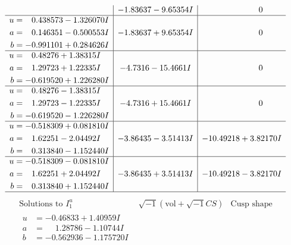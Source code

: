 \documentclass[1p]{elsarticle_modified}
\theoremstyle{definition}
\newcommand{\I}{\sqrt{-1}}
\begin{document}
$$\begin{array}{c|c|c}
 & -1.83637 - 9.65354 I & \phantom{-0.000000 } 0 \\ \hline\begin{aligned}
u &= \phantom{-}0.438573 - 1.326070 I \\
a &= \phantom{-}0.146351 - 0.500553 I \\
b &= -0.991101 + 0.284626 I\end{aligned}
 & -1.83637 + 9.65354 I & \phantom{-0.000000 } 0 \\ \hline\begin{aligned}
u &= \phantom{-}0.48276 + 1.38315 I \\
a &= \phantom{-}1.29723 + 1.22335 I \\
b &= -0.619520 + 1.226280 I\end{aligned}
 & -4.7316 - 15.4661 I & \phantom{-0.000000 } 0 \\ \hline\begin{aligned}
u &= \phantom{-}0.48276 - 1.38315 I \\
a &= \phantom{-}1.29723 - 1.22335 I \\
b &= -0.619520 - 1.226280 I\end{aligned}
 & -4.7316 + 15.4661 I & \phantom{-0.000000 } 0 \\ \hline\begin{aligned}
u &= -0.518309 + 0.081810 I \\
a &= \phantom{-}1.62251 - 2.04492 I \\
b &= \phantom{-}0.313840 - 1.152440 I\end{aligned}
 & -3.86435 - 3.51413 I & -10.49218 + 3.82170 I \\ \hline\begin{aligned}
u &= -0.518309 - 0.081810 I \\
a &= \phantom{-}1.62251 + 2.04492 I \\
b &= \phantom{-}0.313840 + 1.152440 I\end{aligned}
 & -3.86435 + 3.51413 I & -10.49218 - 3.82170 I\\
 \hline 
 \end{array}$$\newpage$$\begin{array}{c|c|c}  
\text{Solutions to }I^u_{1}& \I (\text{vol} + \sqrt{-1}CS) & \text{Cusp shape}\\
 \hline 
\begin{aligned}
u &= -0.46833 + 1.40959 I \\
a &= \phantom{-}1.28786 - 1.10744 I \\
b &= -0.562936 - 1.175720 I\end{aligned}

\end{array}$$
\end{document}
